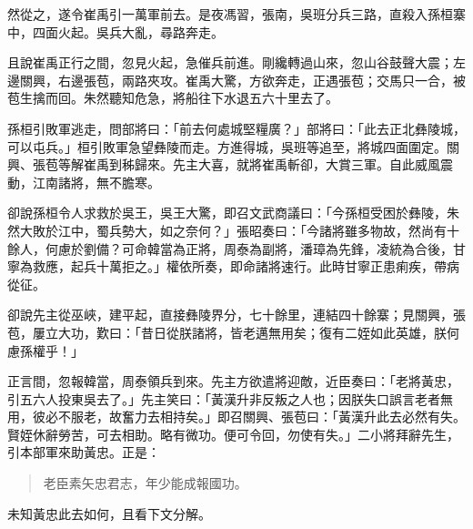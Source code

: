 然從之，遂令崔禹引一萬軍前去。是夜馮習，張南，吳班分兵三路，直殺入孫桓寨中，四面火起。吳兵大亂，尋路奔走。

且說崔禹正行之間，忽見火起，急催兵前進。剛纔轉過山來，忽山谷鼓聲大震；左邊關興，右邊張苞，兩路夾攻。崔禹大驚，方欲奔走，正遇張苞；交馬只一合，被苞生擒而回。朱然聽知危急，將船往下水退五六十里去了。

孫桓引敗軍逃走，問部將曰：「前去何處城堅糧廣？」部將曰：「此去正北彝陵城，可以屯兵。」桓引敗軍急望彝陵而走。方進得城，吳班等追至，將城四面圍定。關興、張苞等解崔禹到秭歸來。先主大喜，就將崔禹斬卻，大賞三軍。自此威風震動，江南諸將，無不膽寒。

卻說孫桓令人求救於吳王，吳王大驚，即召文武商議曰：「今孫桓受困於彝陵，朱然大敗於江中，蜀兵勢大，如之奈何？」張昭奏曰：「今諸將雖多物故，然尚有十餘人，何慮於劉備？可命韓當為正將，周泰為副將，潘璋為先鋒，凌統為合後，甘寧為救應，起兵十萬拒之。」權依所奏，即命諸將速行。此時甘寧正患痢疾，帶病從征。

卻說先主從巫峽，建平起，直接彝陵界分，七十餘里，連結四十餘寨；見關興，張苞，屢立大功，歎曰：「昔日從朕諸將，皆老邁無用矣；復有二姪如此英雄，朕何慮孫權乎！」

正言間，忽報韓當，周泰領兵到來。先主方欲遣將迎敵，近臣奏曰：「老將黃忠，引五六人投東吳去了。」先主笑曰：「黃漢升非反叛之人也；因朕失口誤言老者無用，彼必不服老，故奮力去相持矣。」即召關興、張苞曰：「黃漢升此去必然有失。賢姪休辭勞苦，可去相助。略有微功。便可令回，勿使有失。」二小將拜辭先生，引本部軍來助黃忠。正是：

\begin{quote}
老臣素矢忠君志，年少能成報國功。
\end{quote}

未知黃忠此去如何，且看下文分解。

